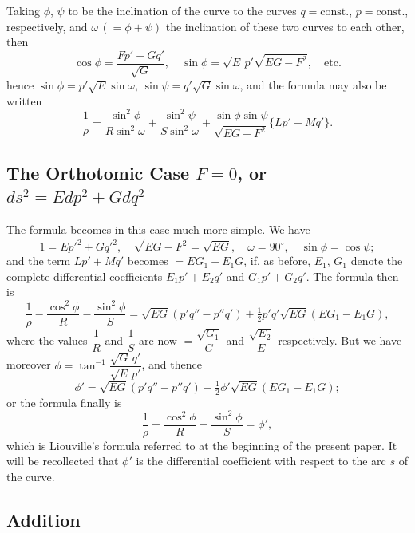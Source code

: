 \documentclass[11pt,a4paper]{article}
\theoremstyle{definition}
\begin{document}
Taking $\phi$, $\psi$ to be the inclination of the curve to the curves $q = \text{const.}$, $p = \text{const.}$, respectively, and $\omega\,(= \phi + \psi)$ the inclination of these two curves to each other, then
\[
\cos\phi = \frac{Fp' + Gq'}{\sqrt{G}},\quad \sin\phi = \sqrt{E}\,p'\sqrt{EG - F^2},\quad \text{etc.}
\]
hence $\sin\phi = p'\sqrt{E}\sin\omega$, $\sin\psi = q'\sqrt{G}\sin\omega$, and the formula may also be written
\[
\frac{1}{\rho} = \frac{\sin^2\phi}{R \sin^2\omega} + \frac{\sin^2\psi}{S \sin^2\omega} + \frac{\sin\phi \sin\psi}{\sqrt{EG - F^2}}\{Lp' + Mq'\}.
\]

\subsection*{The Orthotomic Case $F = 0$, or $ds^2 = Edp^2 + Gdq^2$}

The formula becomes in this case much more simple. We have
\[
1 = Ep'^2 + Gq'^2,\quad \sqrt{EG - F^2} = \sqrt{EG},\quad \omega = 90^\circ,\quad \sin\phi = \cos\psi;
\]
and the term $Lp' + Mq'$ becomes $= EG_1 - E_1G$, if, as before, $E_1$, $G_1$ denote the complete differential coefficients $E_1p' + E_2q'$ and $G_1p' + G_2q'$. The formula then is
\[
\frac{1}{\rho} - \frac{\cos^2\phi}{R} - \frac{\sin^2\phi}{S} = \sqrt{EG}(p'q'' - p''q') + \tfrac{1}{2}p'q'\sqrt{EG}(EG_1 - E_1G),
\]
where the values $\dfrac{1}{R}$ and $\dfrac{1}{S}$ are now $= \dfrac{\sqrt{G_1}}{G}$ and $\dfrac{\sqrt{E_2}}{E}$ respectively. But we have moreover $\phi = \tan^{-1}\dfrac{\sqrt{G}\,q'}{\sqrt{E}\,p'}$, and thence
\[
\phi' = \sqrt{EG}(p'q'' - p''q') - \tfrac{1}{2}\phi'\sqrt{EG}(EG_1 - E_1G);
\]
or the formula finally is
\[
\frac{1}{\rho} - \frac{\cos^2\phi}{R} - \frac{\sin^2\phi}{S} = \phi',
\]
which is Liouville's formula referred to at the beginning of the present paper. It will be recollected that $\phi'$ is the differential coefficient with respect to the arc $s$ of the curve.

\subsection*{Addition}
\end{document}
